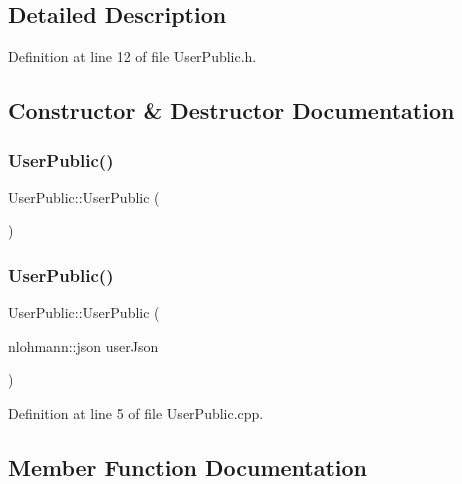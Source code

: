 \subsection{Detailed Description}


Definition at line 12 of file User\+Public.\+h.



\subsection{Constructor \& Destructor Documentation}
\mbox{\label{class_user_public_ac3e65a9ba0268bd28b5a38b7f6e6e6e0}} 
\subsubsection{\texorpdfstring{User\+Public()}{UserPublic()}\hspace{0.1cm}{\footnotesize\ttfamily [1/2]}}
{\footnotesize\ttfamily User\+Public\+::\+User\+Public (\begin{DoxyParamCaption}{ }\end{DoxyParamCaption})\hspace{0.3cm}{\ttfamily [default]}}

\mbox{\label{class_user_public_a1f0517916adfe698bcb7aa7e446615e5}} 
\subsubsection{\texorpdfstring{User\+Public()}{UserPublic()}\hspace{0.1cm}{\footnotesize\ttfamily [2/2]}}
{\footnotesize\ttfamily User\+Public\+::\+User\+Public (\begin{DoxyParamCaption}\item[{nlohmann\+::json}]{user\+Json }\end{DoxyParamCaption})}



Definition at line 5 of file User\+Public.\+cpp.



\subsection{Member Function Documentation}
\mbox{\label{class_user_public_a885fcf27d03450f3fa0de0ea471e0e33}} 
